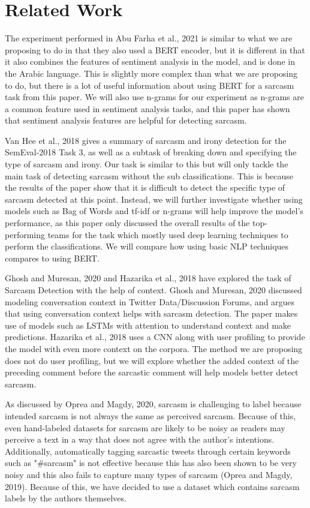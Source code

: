 \documentclass[11pt,a4paper]{article}
\begin{document}
\section{Related Work}

The experiment performed in Abu Farha et al., 2021 is similar to what we are proposing to do in that they also used a BERT encoder, but it is different in that it also combines the features of sentiment analysis in the model, and is done in the Arabic language. This is slightly more complex than what we are proposing to do, but there is a lot of useful information about using BERT for a sarcasm task from this paper. We will also use n-grams for our experiment as n-grams are a common feature used in sentiment analysis tasks, and this paper has shown that sentiment analysis features are helpful for detecting sarcasm.

Van Hee et al., 2018 gives a summary of sarcasm and irony detection for the SemEval-2018 Task 3, as well as a subtask of breaking down and specifying the type of sarcasm and irony. Our task is similar to this but will only tackle the main task of detecting sarcasm without the sub classifications. This is because the results of the paper show that it is difficult to detect the specific type of sarcasm detected at this point. Instead, we will further investigate whether using models such as Bag of Words and tf-idf or n-grams will help improve the model's performance, as this paper only discussed the overall results of the top-performing teams for the task which mostly used deep learning techniques to perform the classifications. We will compare how using basic NLP techniques compares to using BERT.

Ghosh and Muresan, 2020 and Hazarika et al., 2018 have explored the task of Sarcasm Detection with the help of context. Ghosh and Muresan, 2020 discussed modeling conversation context in Twitter Data/Discussion Forums, and argues that using conversation context helps with sarcasm detection. The paper  makes use of models such as LSTMs with attention to understand context and make predictions. Hazarika et al., 2018 uses a CNN along with user profiling to provide the model with even more context on the corpora. The method we are proposing does not do user profiling, but we will explore whether the added context of the preceding comment before the sarcastic comment will help models better detect sarcasm.

As discussed by Oprea and Magdy, 2020, sarcasm is challenging to label because intended sarcasm is not always the same as perceived sarcasm. Because of this, even hand-labeled datasets for sarcasm are likely to be noisy as readers may perceive a text in a way that does not agree with the author's intentions. Additionally, automatically tagging sarcastic tweets through certain keywords such as "#sarcasm" is not effective because this has also been shown to be very noisy and this also fails to capture many types of sarcasm (Oprea and Magdy, 2019). Because of this, we have decided to use a dataset which contains sarcasm labels by the authors themselves.
\end{document}
